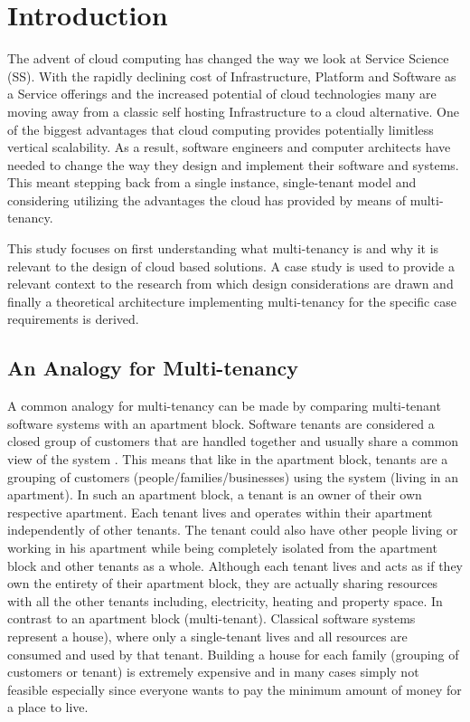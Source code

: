 \chapter{Introduction}
The advent of cloud computing has changed the way we look at Service Science (SS). With the rapidly declining cost of Infrastructure, Platform and Software as a Service offerings and the increased potential of cloud technologies many are moving away from a classic self hosting Infrastructure to a cloud alternative. One of the biggest advantages that cloud computing provides potentially limitless vertical scalability. As a result, software engineers and computer architects have needed to change the way they design and implement their software and systems. This meant stepping back from a single instance, single-tenant model and considering utilizing the advantages the cloud has provided by means of multi-tenancy.
 
This study focuses on first understanding what multi-tenancy is and why it is relevant to the design of cloud based solutions. A case study is used to provide a relevant context to the research from which design considerations are drawn and finally a theoretical architecture implementing multi-tenancy for the specific case requirements is derived.


\section{An Analogy for Multi-tenancy}

A common analogy for multi-tenancy can be made by comparing multi-tenant software systems with an apartment block. Software tenants are considered a closed group of customers that are handled together and usually share a common view of the system \cite{Krebs2012} \cite{Wilder}. This means that like in the apartment block, tenants are a grouping of customers (people/families/businesses) using the system (living in an apartment). In such an apartment block, a tenant is an owner of their own respective apartment. Each tenant lives and operates within their apartment independently of other tenants. The tenant could also have other people living or working in his apartment while being completely isolated from the apartment block and other tenants as a whole. Although each tenant lives and acts as if they own the entirety of their apartment block, they are actually sharing resources with all the other tenants including, electricity, heating and property space. In contrast to an apartment block (multi-tenant). Classical software systems represent a house), where only a single-tenant lives and all resources are consumed and used by that tenant. Building a house for each family (grouping of customers or tenant) is extremely expensive and in many cases simply not feasible especially since everyone wants to pay the minimum amount of money for a place to live.
 
